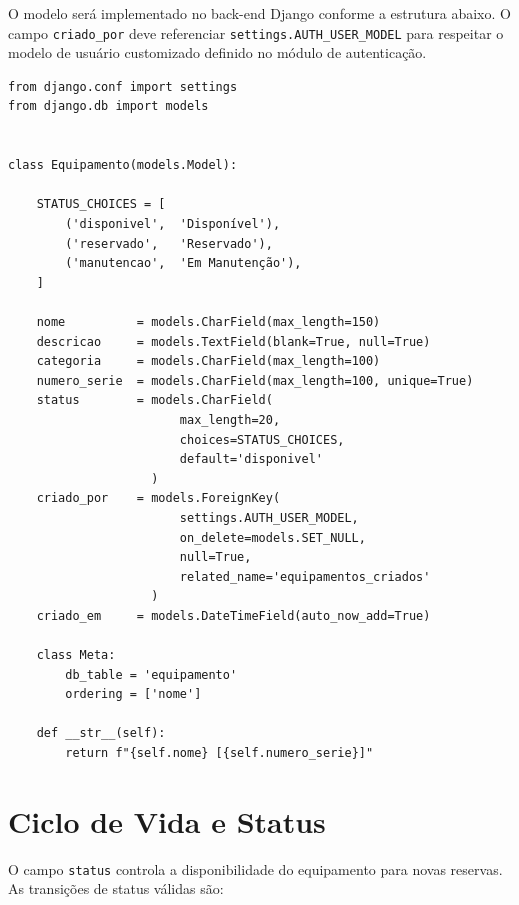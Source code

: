 \documentclass[12pt,a4paper]{article}
\begin{document}
O modelo será implementado no back-end Django conforme a estrutura abaixo.
O campo \texttt{criado\_por} deve referenciar \texttt{settings.AUTH\_USER\_MODEL}
para respeitar o modelo de usuário customizado definido no módulo de autenticação.

\begin{verbatim}
from django.conf import settings
from django.db import models


class Equipamento(models.Model):

    STATUS_CHOICES = [
        ('disponivel',  'Disponível'),
        ('reservado',   'Reservado'),
        ('manutencao',  'Em Manutenção'),
    ]

    nome          = models.CharField(max_length=150)
    descricao     = models.TextField(blank=True, null=True)
    categoria     = models.CharField(max_length=100)
    numero_serie  = models.CharField(max_length=100, unique=True)
    status        = models.CharField(
                        max_length=20,
                        choices=STATUS_CHOICES,
                        default='disponivel'
                    )
    criado_por    = models.ForeignKey(
                        settings.AUTH_USER_MODEL,
                        on_delete=models.SET_NULL,
                        null=True,
                        related_name='equipamentos_criados'
                    )
    criado_em     = models.DateTimeField(auto_now_add=True)

    class Meta:
        db_table = 'equipamento'
        ordering = ['nome']

    def __str__(self):
        return f"{self.nome} [{self.numero_serie}]"
\end{verbatim}

\section{Ciclo de Vida e Status}

O campo \texttt{status} controla a disponibilidade do equipamento para novas reservas.
As transições de status válidas são:
\end{document}
